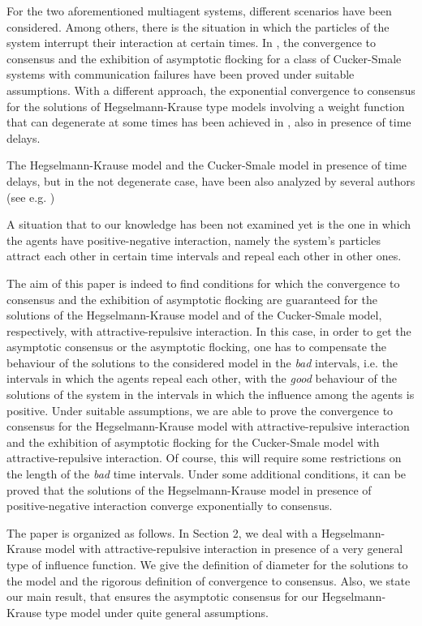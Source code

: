 \documentclass[a4paper,11pt,oneside]{article}
\begin{document}
	For the two aforementioned multiagent systems, different scenarios have been considered. Among others, there is the situation in which the particles of the system interrupt their interaction at certain times. In \cite{Bonnet}, the convergence to consensus and the exhibition of asymptotic flocking for a class of Cucker-Smale systems with communication failures have been proved under suitable assumptions. With a different approach, the exponential convergence to consensus for the solutions of Hegselmann-Krause type models  involving a weight function that can degenerate at some times has been achieved in \cite{onoff}, also in presence of time delays.

	 The Hegselmann-Krause model and the Cucker-Smale model in presence of time delays, but in the not degenerate case,  have been also analyzed by several authors (see e.g. \cite{Cont, ContPign, Lu, LW, CH, CL, PT, HM, DH,  CPP, H3, Cartabia})
	
	A situation that to our knowledge has been not examined yet is the one in which the agents have positive-negative interaction, namely the system's particles attract each other in certain time intervals and repeal each other in other ones. 
	
	The aim of this paper is indeed to find conditions for which the convergence to consensus and the exhibition of asymptotic flocking are guaranteed for the solutions of the Hegselmann-Krause model and of the Cucker-Smale model, respectively, with attractive-repulsive interaction. In this case, in order to get the asymptotic consensus or the asymptotic flocking, one has to compensate the behaviour of the solutions to the considered model in the {\it bad} intervals, i.e. the intervals in which the agents repeal each other, with the {\it good} behaviour of the solutions of the system in the intervals in which the influence among the agents is positive. Under suitable assumptions, we are able to prove the convergence to consensus for the Hegselmann-Krause model with attractive-repulsive interaction and the exhibition of asymptotic flocking for the Cucker-Smale model with attractive-repulsive interaction. Of course, this will require some restrictions on the length of the {\it bad} time intervals.
Under some additional conditions, it can be proved that the solutions of the Hegselmann-Krause model in presence of positive-negative interaction converge exponentially to consensus.
	
	The paper is organized as follows. In Section 2, we deal with a Hegselmann-Krause model with attractive-repulsive interaction in presence of a very general type of influence function. We give the definition of diameter for the solutions to the model and the rigorous definition of convergence to consensus. Also, we state our main result, that ensures the asymptotic consensus for our Hegselmann-Krause type model under quite general assumptions. 
\end{document}
